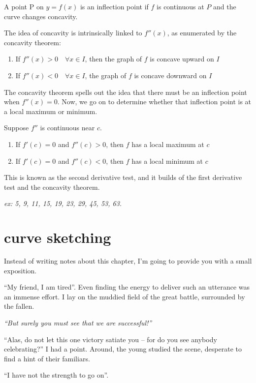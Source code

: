 \documentclass[10pt,a4paper]{report}
\begin{document}
A point P on $y = f(x)$ is an inflection point if $f$ is continuous at $P$ and the curve changes concavity.

The idea of concavity is intrinsically linked to $f''(x)$, as enumerated by the concavity theorem:

\begin{enumerate}
	\item If $f''(x) > 0 \quad \forall x \in I$, then the graph of $f$ is concave upward on $I$
	\item If $f''(x) < 0 \quad \forall x \in I$, the graph of $f$ is concave downward on $I$
\end{enumerate}

The concavity theorem spells out the idea that there must be an inflection point when $f''(x) = 0$. Now, we go on to determine whether that inflection point is at a local maximum or minimum.

Suppose $f''$ is continuous near $c$.
\begin{enumerate}
	\item If $f'(c) = 0$ and $f''(c) > 0$, then $f$ has a local maximum at $c$
	\item If $f'(c) = 0$ and $f''(c) < 0$, then $f$ has a local minimum at $c$
\end{enumerate}

This is known as the second derivative test, and it builds of the first derivative test and the concavity theorem.

\emph{ex: 5, 9, 11, 15, 19, 23, 29, 45, 53, 63.}

\section{curve sketching}

Instead of writing notes about this chapter, I'm going to provide you with a small exposition.

``My friend, I am tired''. Even finding the energy to deliver such an utterance was an immense effort. I lay on the muddied field of the great battle, surrounded by the fallen.

\noindent \emph{``But surely you must see that we are successful!''}

``Alas, do not let this one victory satiate you -- for do you see anybody celebrating?'' I had a point. Around, the young studied the scene, desperate to find a hint of their familiars.

``I have not the strength to go on''.
\end{document}
